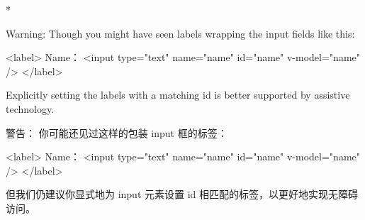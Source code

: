 \begin{paracol}{2} 
 
\switchcolumn[0]*%
\begin{vueQuoteWarn}{Warning:}
Though you might have seen labels wrapping the input fields like this:
\begin{codeHtml}
<label>
  Name：
  <input type="text" name="name" id="name" v-model="name" />
</label>
\end{codeHtml}
Explicitly setting the labels with a matching id is better supported by
assistive technology.
\end{vueQuoteWarn}
\switchcolumn
\begin{vueQuoteWarn}{警告：}
你可能还见过这样的包装 input 框的标签：
\begin{codeHtml}
<label>
  Name：
  <input type="text" name="name" id="name" v-model="name" />
</label>
\end{codeHtml}
但我们仍建议你显式地为 input 元素设置 id
相匹配的标签，以更好地实现无障碍访问。
\end{vueQuoteWarn}
\end{paracol}



\begin{paracol}{2} 

\end{paracol}


\begin{paracol}{2} 

\end{paracol}



\begin{paracol}{2} 

\end{paracol}



\begin{paracol}{2} 

\end{paracol}



\begin{paracol}{2} 

\end{paracol}


\begin{paracol}{2} 

\end{paracol}



